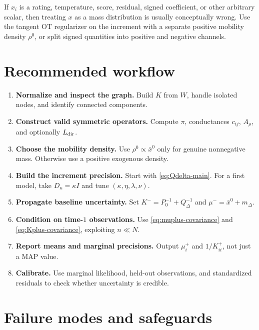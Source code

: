 \documentclass[11pt]{article}
\numberwithin{equation}{section}
\begin{document}
\begin{warningbox}
If $x_i$ is a rating, temperature, score, residual, signed coefficient, or other arbitrary scalar, then treating $x$ as a mass distribution is usually conceptually wrong.  Use the tangent OT regularizer on the increment with a separate positive mobility density $\rho^0$, or split signed quantities into positive and negative channels.
\end{warningbox}

\section{Recommended workflow}
\label{sec:workflow}

\begin{enumerate}[leftmargin=2em]
  \item \textbf{Normalize and inspect the graph.}  Build $K$ from $W$, handle isolated nodes, and identify connected components.
  \item \textbf{Construct valid symmetric operators.}  Compute $\pi$, conductances $c_{ij}$, $A_\rho$, and optionally $L_{\rm dir}$.
  \item \textbf{Choose the mobility density.}  Use $\rho^0\propto\bar x^0$ only for genuine nonnegative mass.  Otherwise use a positive exogenous density.
  \item \textbf{Build the increment precision.}  Start with \eqref{eq:Qdelta-main}.  For a first model, take $D_\kappa=\kappa I$ and tune $(\kappa,\eta,\lambda,\nu)$.
  \item \textbf{Propagate baseline uncertainty.}  Set $K^-=P_0^{-1}+Q_\Delta^{-1}$ and $\mu^-=\bar x^0+m_\Delta$.
  \item \textbf{Condition on time-$1$ observations.}  Use \eqref{eq:muplus-covariance} and \eqref{eq:Kplus-covariance}, exploiting $n\ll N$.
  \item \textbf{Report means and marginal precisions.}  Output $\mu_i^+$ and $1/K^+_{ii}$, not just a MAP value.
  \item \textbf{Calibrate.}  Use marginal likelihood, held-out observations, and standardized residuals to check whether uncertainty is credible.
\end{enumerate}

\section{Failure modes and safeguards}
\label{sec:failure-modes}
\end{document}
